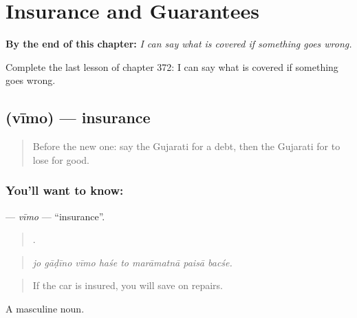 
\chapter{Insurance and Guarantees}
\label{ch:gu-insurance-and-guarantees}

\begin{chapteropening}
\textbf{By the end of this chapter:} \emph{I can say what is covered if something goes wrong.}

Complete the last lesson of chapter 372: I can say what is covered if something goes wrong.
\end{chapteropening}

\section[\texorpdfstring{\gu{વીમો} (vīmo)}{વીમો (vīmo)}]{ (vīmo) — insurance}

\label{lesson:GU-C372-vimo}



\begin{quote}
Before the new one: say the Gujarati for a debt, then the Gujarati for to lose for good.
\end{quote}

\subsection*{You'll want to know: }
\textbf{} — \emph{vīmo} — \textquotedblleft{}insurance\textquotedblright{}.

\begin{quote}
       .
\end{quote}

\begin{quote}
\emph{jo gāḍīno vīmo haśe to marāmatnā paisā bacśe.}
\end{quote}

\begin{quote}
If the car is insured, you will save on repairs.
\end{quote}

A masculine noun.

